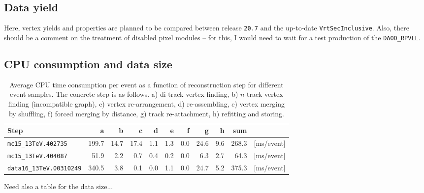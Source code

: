 \documentclass[NOTE, atlasdraft=true, texlive=2018, UKenglish]{\ATLASLATEXPATH atlasdoc}
\begin{document}
\subsection{Data yield}
Here, vertex yields and properties are planned to be compared between release {\tt 20.7} and the up-to-date {\tt VrtSecInclusive}. Also, there should be a comment on the treatment of disabled pixel modules -- for this, I would need to wait for a test production of the {\tt DAOD\_RPVLL}.

\subsection{CPU consumption and data size}

\begin{table}[htbp]
\centering
\caption{Average CPU time consumption per event as a function of reconstruction step for different event samples. The concrete step is as follows. a) di-track vertex finding, b) $n$-track vertex finding (incompatible graph), c) vertex re-arrangement, d) re-assembling, e) vertex merging by shuffling, f) forced merging by distance, g) track re-attachment, h) refitting and storing.}
\begin{tabular}{lrrrrrrrrrr}
\hline
\hline
Step & a & b & c & d & e & f & g & h & sum &\\
\hline
{\tt mc15\_13TeV.402735} & 199.7 & 14.7 & 17.4 & 1.1 & 1.3 & 0.0 & 24.6 & 9.6 & 268.3 & [ms/event]\\
{\tt mc15\_13TeV.404087} & 51.9 & 2.2 & 0.7 & 0.4 & 0.2 & 0.0 & 6.3 & 2.7 & 64.3 & [ms/event]\\
{\tt data16\_13TeV.00310249} & 340.5 & 3.8 & 0.1 & 0.0 & 1.1 & 0.0 & 24.7 & 5.2 & 375.3 & [ms/event]\\
\hline
\hline
\end{tabular}
\label{tbl:default}
\end{table}%

Need also a table for the data size...
\end{document}

